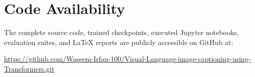 \documentclass[conference]{IEEEtran}
\begin{document}
\section*{Code Availability}
The complete source code, trained checkpoints, executed Jupyter notebooks, evaluation suites, and LaTeX reports are publicly accessible on GitHub at:
\begin{center}
\small\url{https://github.com/Waseem-Irfan-100/Visual-Language-image-captioning-using-Transformers.git}
\end{center}

\end{document}
